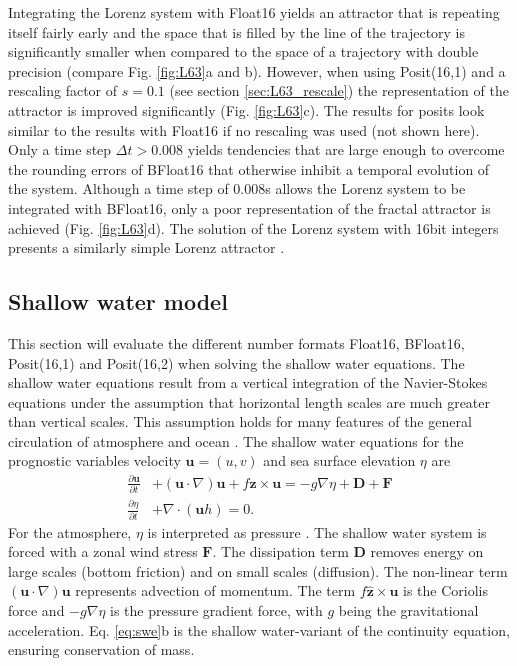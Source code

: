 \documentclass[draft]{agujournal2019}
\begin{document}
Integrating the Lorenz system with Float16 yields an attractor that is repeating itself fairly early and the space that is filled by the line of the trajectory is significantly smaller when compared to the space of a trajectory with double precision (compare Fig. \ref{fig:L63}a and b). However, when using Posit(16,1) and a rescaling factor of $s=0.1$ (see section \ref{sec:L63_rescale}) the representation of the attractor is improved significantly (Fig. \ref{fig:L63}c). The results for posits look similar to the results with Float16 if no rescaling was used (not shown here). Only a time step $\Delta t > 0.008$ yields tendencies that are large enough to overcome the rounding errors of BFloat16 that otherwise inhibit a temporal evolution of the system. Although a time step of 0.008s allows the Lorenz system to be integrated with BFloat16, only a poor representation of the fractal attractor is achieved (Fig. \ref{fig:L63}d). The solution of the Lorenz system with 16bit integers presents a similarly simple Lorenz attractor \cite{Klower2019}.

\subsection{Shallow water model}
\label{sec:swm}

This section will evaluate the different number formats Float16, BFloat16, Posit(16,1) and Posit(16,2) when solving the shallow water equations. The shallow water equations result from a vertical integration of the Navier-Stokes equations under the assumption that horizontal length scales are much greater than vertical scales. This assumption holds for many features of the general circulation of atmosphere and ocean \cite{Gill1982,Vallis2006}. The shallow water equations for the prognostic variables velocity $\mathbf{u} = (u,v)$ and sea surface elevation $\eta$ are
\begin{subequations}
\begin{align}
\frac{\partial \mathbf{u}}{\partial t} &+ (\mathbf{u} \cdot \nabla) \mathbf{u} + f\hat{\mathbf{z}} \times \mathbf{u} = -g\nabla \eta + \mathbf{D} + \mathbf{F} \\
\frac{\partial \eta}{\partial t} &+ \nabla \cdot (\mathbf{u}h) = 0.
\end{align}
\label{eq:swe}%
\end{subequations}
For the atmosphere, $\eta$ is interpreted as pressure \cite{Gill1982}. The shallow water system is forced with a zonal wind stress $\mathbf{F}$. The dissipation term $\mathbf{D}$ removes energy on large scales (bottom friction) and on small scales (diffusion). The non-linear term $(\mathbf{u} \cdot \nabla) \mathbf{u}$ represents advection of momentum. The term $f\hat{\mathbf{z}} \times \mathbf{u}$ is the Coriolis force and $-g\nabla \eta$ is the pressure gradient force, with $g$ being the gravitational acceleration. Eq. \ref{eq:swe}b is the shallow water-variant of the continuity equation, ensuring conservation of mass. 
\end{document}
